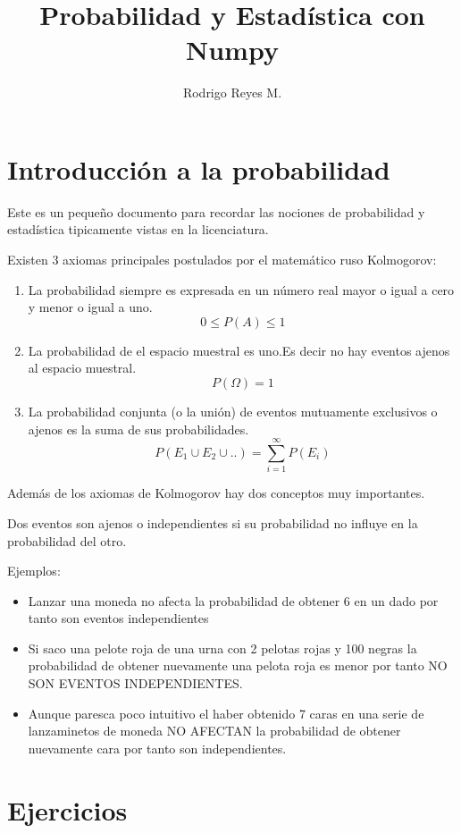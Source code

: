 \documentclass{article}
\title{Probabilidad y Estadística con Numpy}
\author{Rodrigo Reyes M.}
\begin{document}
\maketitle

\section{Introducción a la probabilidad}

Este es un pequeño documento para recordar las nociones de probabilidad y estadística tipicamente vistas en la licenciatura.

Existen 3 axiomas principales postulados por el matemático ruso Kolmogorov:

\begin{enumerate}
\item La probabilidad siempre es expresada en un número real mayor o igual a cero y menor o igual a uno.
$$ 0 \leq P(A) \leq 1 $$
\item La probabilidad de el espacio muestral es uno.Es decir no hay eventos ajenos al espacio muestral.
$$ P(\Omega) = 1 $$
\item La probabilidad conjunta (o la unión) de eventos mutuamente exclusivos o ajenos es la suma de sus probabilidades.
$$ P(E_1 \cup E_2 \cup ..) = \sum_{i=1}^{\infty} P(E_i) $$
\end{enumerate}

Además de los axiomas de Kolmogorov hay dos conceptos muy importantes.

Dos eventos son ajenos o independientes si su probabilidad no influye en la probabilidad del otro.

Ejemplos:
\begin{itemize}
\item Lanzar una moneda no afecta la probabilidad de obtener 6 en un dado por tanto son eventos independientes
\item Si saco una pelote roja de una urna con 2 pelotas rojas y 100 negras la probabilidad de obtener nuevamente una pelota roja es menor por tanto NO SON EVENTOS INDEPENDIENTES.
\item Aunque paresca poco intuitivo el haber obtenido 7 caras en una serie de lanzaminetos de moneda NO AFECTAN la probabilidad de obtener nuevamente cara por tanto son independientes.
\end{itemize}

\section{Ejercicios}
\end{document}
